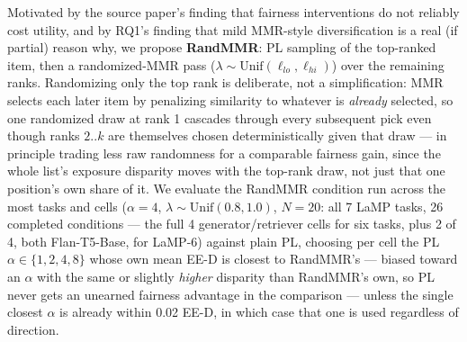 \documentclass[10pt,twocolumn]{article}
\begin{document}
Motivated by the source paper's finding that fairness interventions do not reliably
cost utility, and by RQ1's finding that mild MMR-style diversification is a real (if
partial) reason why, we propose
\textbf{RandMMR}: PL sampling of the top-ranked item, then a randomized-MMR pass
($\lambda \sim \mathrm{Unif}(\ell_{lo},\ell_{hi})$) over the remaining ranks.
Randomizing only the top rank is deliberate, not a simplification: MMR selects each
later item by penalizing similarity to whatever is \emph{already} selected, so one
randomized draw at rank 1 cascades through every subsequent pick even though ranks
$2..k$ are themselves chosen deterministically given that draw --- in principle
trading less raw randomness for a comparable fairness gain, since the whole list's
exposure disparity moves with the top-rank draw, not just that one position's own
share of it. We
evaluate the RandMMR condition run across the most tasks and cells ($\alpha{=}4$,
$\lambda\sim\mathrm{Unif}(0.8,1.0)$, $N{=}20$: all 7 LaMP tasks, 26 completed
conditions --- the full 4 generator/retriever cells for six tasks, plus 2 of 4, both
Flan-T5-Base, for LaMP-6) against plain PL, choosing per
cell the PL $\alpha \in \{1,2,4,8\}$ whose own mean EE-D is closest to RandMMR's ---
biased toward an $\alpha$ with the same or slightly \emph{higher} disparity than
RandMMR's own, so PL never gets an unearned fairness advantage in the comparison ---
unless the single closest $\alpha$ is already within 0.02 EE-D, in which case that one
is used regardless of direction.
\end{document}
